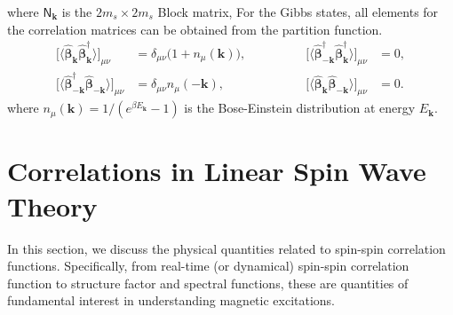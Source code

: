 \documentclass[aps, prx, nofootinbib, superscriptaddress]{revtex4-2}
\newcommand{\kvec}{\mathbf{k}}
\begin{document}
where $\mathsf{N}_{\kvec}$ is the $2m_{s} \times 2m_{s}$ Block matrix, 
For the Gibbs states, all elements for the correlation matrices can be obtained from the partition function. 
\begin{equation}
    \begin{array}{rlrl}
        \big[ \langle \hat{\bm \beta}_{ \kvec}^{\phantom \dagger} \hat{\bm \beta}_{ \kvec}^{\dagger} \rangle \big]_{\mu\nu} 
        & = \delta_{\mu\nu} \big( 1 + n_{\mu}(\kvec) \big) , 
        \qquad & \qquad 
        \big[ \langle \hat{\bm\beta}_{-\kvec}^{\dagger} \hat{\bm\beta}_{\kvec}^{\dagger} \rangle \big]_{\mu\nu} & = 0  ,
        \\[0.5em]
        \big[ \langle \hat{\bm\beta}_{-\kvec}^{\dagger} \hat{\bm\beta}_{- \kvec}^{\phantom \dagger} \rangle \big]_{\mu\nu}
        & = \delta_{\mu\nu} n_{\mu}(-\kvec) ,
        \qquad & \qquad 
        \big[ \langle \hat{\bm\beta}_{\kvec} \hat{\bm\beta}_{-\kvec} \rangle \big]_{\mu\nu} & = 0.
    \end{array}
\end{equation}
where $n_{\mu}(\kvec) = 1/(e^{\beta E_{\kvec}} - 1)$ is the Bose-Einstein distribution at energy $E_{\kvec}$. 








\newpage
\section{Correlations in Linear Spin Wave Theory}

In this section, we discuss the physical quantities related to spin-spin correlation functions. Specifically, from real-time (or dynamical) spin-spin correlation function to structure factor and spectral functions, these are quantities of fundamental interest in understanding magnetic excitations.
\end{document}
